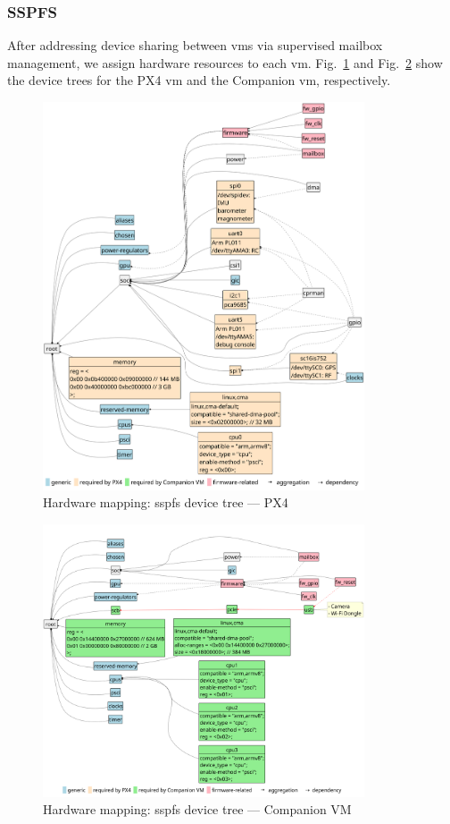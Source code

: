 \subsubsection{SSPFS}
\label{sec:final-scenario}
After addressing device sharing between \glspl{vm} via supervised mailbox
management, we assign hardware resources to each \gls{vm}.
%
Fig.~\ref{fig:hw-map-2} and Fig.~\ref{fig:hw-map-3} show the device trees
for the PX4 \gls{vm} and the Companion \gls{vm}, respectively.

\begin{figure}[!hbt]
  \centering
  \includegraphics[width=0.85\textwidth]{./img/pdf/hw-map-2}
  \caption[Hardware mapping: SSPFS device tree -- PX4]{Hardware mapping:
  \gls{sspfs} device tree — PX4}%
  \label{fig:hw-map-2}
\end{figure}

\begin{figure}[!hbt]
  \centering
  \includegraphics[width=0.85\textwidth]{./img/pdf/hw-map-3}
  \caption[Hardware mapping: SSPFS device tree -- Companion VM]{Hardware
    mapping: \gls{sspfs} device tree — Companion VM}%
  \label{fig:hw-map-3}
\end{figure}

